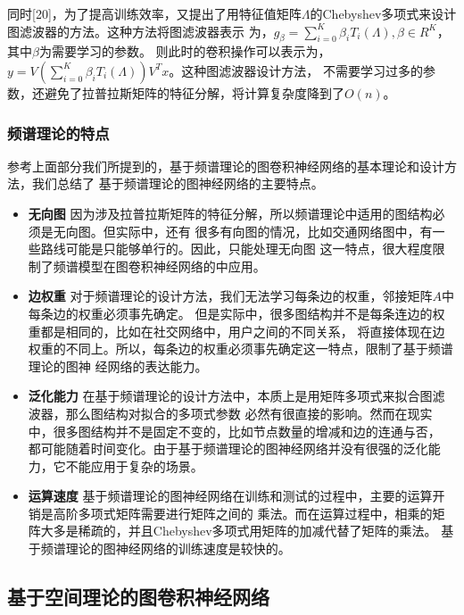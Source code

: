 同时[20]，为了提高训练效率，又提出了用特征值矩阵$ \Lambda $的Chebyshev多项式来设计图滤波器的方法。这种方法将图滤波器表示
为，$ g_{\beta} = {\sum_{i=0}^{K}} \beta_{i} T_{i}(\Lambda),  \beta \in R^K $，其中$ \beta $为需要学习的参数。
则此时的卷积操作可以表示为，$ y = V ({\sum_{i=0}^{K}} \beta_{i} T_{i}(\Lambda)) V^{T} x $。这种图滤波器设计方法，
不需要学习过多的参数，还避免了拉普拉斯矩阵的特征分解，将计算复杂度降到了$ O(n) $。

\subsubsection{频谱理论的特点}
参考上面部分我们所提到的，基于频谱理论的图卷积神经网络的基本理论和设计方法，我们总结了
基于频谱理论的图神经网络的主要特点。
\begin{itemize}
    \item \textbf{无向图} \quad
    因为涉及拉普拉斯矩阵的特征分解，所以频谱理论中适用的图结构必须是无向图。但实际中，还有
    很多有向图的情况，比如交通网络图中，有一些路线可能是只能够单行的。因此，只能处理无向图
    这一特点，很大程度限制了频谱模型在图卷积神经网络的中应用。
    
    \item \textbf{边权重} \quad
    对于频谱理论的设计方法，我们无法学习每条边的权重，邻接矩阵$A$中每条边的权重必须事先确定。
    但是实际中，很多图结构并不是每条连边的权重都是相同的，比如在社交网络中，用户之间的不同关系，
    将直接体现在边权重的不同上。所以，每条边的权重必须事先确定这一特点，限制了基于频谱理论的图神
    经网络的表达能力。

    \item \textbf{泛化能力} \quad
    在基于频谱理论的设计方法中，本质上是用矩阵多项式来拟合图滤波器，那么图结构对拟合的多项式参数
    必然有很直接的影响。然而在现实中，很多图结构并不是固定不变的，比如节点数量的增减和边的连通与否，
    都可能随着时间变化。由于基于频谱理论的图神经网络并没有很强的泛化能力，它不能应用于复杂的场景。

    \item \textbf{运算速度} \quad
    基于频谱理论的图神经网络在训练和测试的过程中，主要的运算开销是高阶多项式矩阵需要进行矩阵之间的
    乘法。而在运算过程中，相乘的矩阵大多是稀疏的，并且Chebyshev多项式用矩阵的加减代替了矩阵的乘法。
    基于频谱理论的图神经网络的训练速度是较快的。
\end{itemize}

\subsection{基于空间理论的图卷积神经网络}

